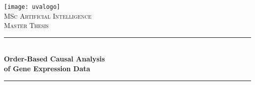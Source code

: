 
\begin{titlepage}



    \newcommand{\HRule}{\rule{\linewidth}{0.5mm}} %
    
    \center %
    
     
    
    
    
    
    
    
    \texttt{[image: uvalogo]}\\[2.5cm]
    
    \textsc{\Large MSc Artificial Intelligence}\\[0.2cm]
    
    \textsc{\Large Master Thesis}\\[0.5cm] 
    
    
    
    
    
    
    
    
    \HRule \\[0.4cm]
    
    { \huge \bfseries Order-Based Causal Analysis \\ of Gene Expression Data}\\[0.4cm] %
    
    \HRule \\[0.5cm]
    
     
    
    
    
    

\end{titlepage}
